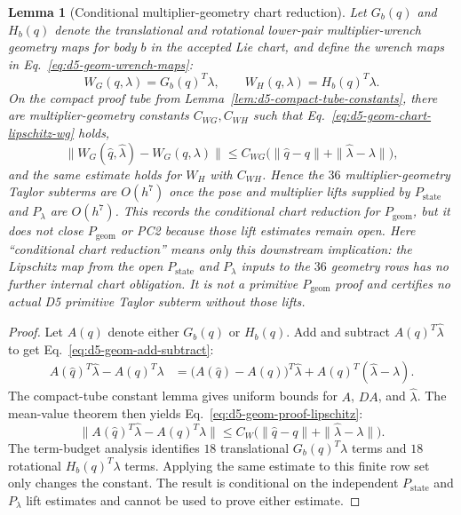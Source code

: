 \documentclass[preprint,12pt]{elsarticle}
\newtheorem{lemma}{Lemma}
\begin{document}
\begin{lemma}[Conditional multiplier-geometry chart reduction]
\label{lem:d5-geom-chart-reduction}
Let \(G_b(q)\) and \(H_b(q)\) denote the translational and rotational
lower-pair multiplier-wrench geometry maps for body \(b\) in the accepted
Lie chart, and define the wrench maps in
Eq.~\eqref{eq:d5-geom-wrench-maps}:
\begin{equation}
\label{eq:d5-geom-wrench-maps}
  W_G(q,\lambda)=G_b(q)^T\lambda,\qquad
  W_H(q,\lambda)=H_b(q)^T\lambda .
\end{equation}
On the compact proof tube from Lemma~\ref{lem:d5-compact-tube-constants},
there are multiplier-geometry constants \(C_{WG},C_{WH}\) such that
Eq.~\eqref{eq:d5-geom-chart-lipschitz-wg} holds,
\begin{equation}
\label{eq:d5-geom-chart-lipschitz-wg}
  \|W_G(\widehat q,\widehat\lambda)-W_G(q,\lambda)\|
  \le C_{WG}\bigl(\|\widehat q-q\|+\|\widehat\lambda-\lambda\|\bigr),
\end{equation}
and the same estimate holds for \(W_H\) with \(C_{WH}\).  Hence the \(36\)
multiplier-geometry Taylor subterms are \(O(h^7)\) once the pose and
multiplier lifts supplied by \(P_{\mathrm{state}}\) and \(P_{\lambda}\) are
\(O(h^7)\).  This records the conditional chart reduction for
\(P_{\mathrm{geom}}\), but it does not close \(P_{\mathrm{geom}}\) or PC2
because those lift estimates remain open.  Here ``conditional chart
reduction'' means only this downstream implication: the Lipschitz map from the open
\(P_{\mathrm{state}}\) and \(P_{\lambda}\) inputs to the \(36\) geometry
rows has no further internal chart obligation.  It is not a primitive
\(P_{\mathrm{geom}}\) proof and certifies no actual D5 primitive Taylor
subterm without those lifts.
\end{lemma}

\begin{proof}
Let \(A(q)\) denote either \(G_b(q)\) or \(H_b(q)\).  Add and subtract
\(A(q)^T\widehat\lambda\) to get
Eq.~\eqref{eq:d5-geom-add-subtract}:
\begin{equation}
\label{eq:d5-geom-add-subtract}
\begin{aligned}
 A(\widehat q)^T\widehat\lambda-A(q)^T\lambda
 &=
 \bigl(A(\widehat q)-A(q)\bigr)^T\widehat\lambda
 + A(q)^T(\widehat\lambda-\lambda).
\end{aligned}
\end{equation}
The compact-tube constant lemma gives uniform bounds for \(A\), \(D A\), and
\(\widehat\lambda\).  The mean-value theorem then yields
Eq.~\eqref{eq:d5-geom-proof-lipschitz}:
\begin{equation}
\label{eq:d5-geom-proof-lipschitz}
\|A(\widehat q)^T\widehat\lambda-A(q)^T\lambda\|
\le C_W\bigl(\|\widehat q-q\|+\|\widehat\lambda-\lambda\|\bigr).
\end{equation}
The term-budget analysis identifies \(18\) translational
\(G_b(q)^T\lambda\) terms and \(18\) rotational \(H_b(q)^T\lambda\) terms.
Applying the same estimate to this finite row set only changes the constant.
The result is conditional on the independent \(P_{\mathrm{state}}\) and
\(P_{\lambda}\) lift estimates and cannot be used to prove either estimate.
\end{proof}
\end{document}
